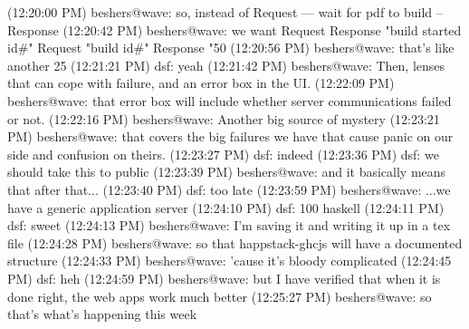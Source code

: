 (12:20:00 PM) beshers@wave: so, instead of Request --- wait for pdf to build -- Response
(12:20:42 PM) beshers@wave: we want Request Response "build started id#"   Request "build id#"  Response "50%
(12:20:56 PM) beshers@wave: that's like another 25%
(12:21:21 PM) dsf: yeah
(12:21:42 PM) beshers@wave: Then, lenses that can cope with failure, and an error box in the UI.
(12:22:09 PM) beshers@wave: that error box will include whether server communications failed or not.
(12:22:16 PM) beshers@wave: Another big source of mystery
(12:23:21 PM) beshers@wave: that covers the big failures we have that cause panic on our side and confusion on theirs.
(12:23:27 PM) dsf: indeed
(12:23:36 PM) dsf: we should take this to public
(12:23:39 PM) beshers@wave: and it basically means that after that...
(12:23:40 PM) dsf: too late
(12:23:59 PM) beshers@wave: ...we have a generic application server
(12:24:10 PM) dsf: 100 haskell
(12:24:11 PM) dsf: sweet
(12:24:13 PM) beshers@wave: I'm saving it and writing it up in a tex file
(12:24:28 PM) beshers@wave: so that happstack-ghcjs will have a documented structure
(12:24:33 PM) beshers@wave: 'cause it's bloody complicated
(12:24:45 PM) dsf: heh
(12:24:59 PM) beshers@wave: but I have verified that when it is done right, the web apps work much better
(12:25:27 PM) beshers@wave: so that's what's happening this week

